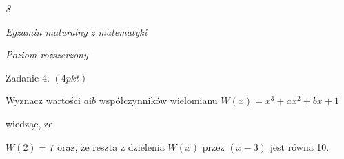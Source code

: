 \documentclass[a4paper,12pt]{article}
\begin{document}
{\it 8}

{\it Egzamin maturalny z matematyki}

{\it Poziom rozszerzony}

Zadanie 4. $(4pkt)$

Wyznacz wartości $a\mathrm{i}b$ współczynników wielomianu $W(x)=x^{3}+ax^{2}+bx+1$

wiedząc, $\dot{\mathrm{z}}\mathrm{e}$

$W(2)=7$ oraz, $\dot{\mathrm{z}}\mathrm{e}$ reszta z dzielenia $W(x)$ przez $(x-3)$ jest równa 10.
\end{document}
